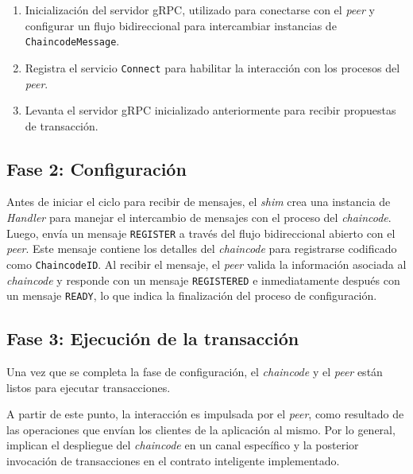 \begin{enumerate}
\item Inicialización del servidor gRPC, utilizado para conectarse con el \textit{peer} y configurar un flujo bidireccional para intercambiar instancias de \texttt{ChaincodeMessage}.


\item Registra el servicio \texttt{Connect} para habilitar la interacción con los procesos del \textit{peer}.

\item Levanta el servidor gRPC inicializado anteriormente  para recibir propuestas de transacción.
\end{enumerate}

\subsection{Fase 2: Configuración}
Antes de iniciar el ciclo para recibir de mensajes, el \textit{shim} crea una instancia de \textit{Handler} para manejar el intercambio de mensajes con el proceso del \textit{chaincode}. Luego, envía un mensaje \texttt{REGISTER} a través del flujo bidireccional abierto con el \textit{peer}. Este mensaje contiene los detalles del \textit{chaincode} para registrarse codificado como \texttt{ChaincodeID}. Al recibir el mensaje, el \textit{peer} valida la información asociada al \textit{chaincode} y responde con un mensaje \texttt{REGISTERED} e inmediatamente después con un mensaje \texttt{READY}, lo que indica la finalización del proceso de configuración.

\subsection{Fase 3: Ejecución de la transacción}
Una vez que se completa la fase de configuración, el \textit{chaincode} y el \textit{peer} están listos para ejecutar transacciones.

A partir de este punto, la interacción es impulsada por el \textit{peer}, como resultado de las operaciones que envían los clientes de la aplicación al mismo. Por lo general, implican el despliegue del \textit{chaincode} en un canal específico y la posterior invocación de transacciones en el contrato inteligente implementado.

